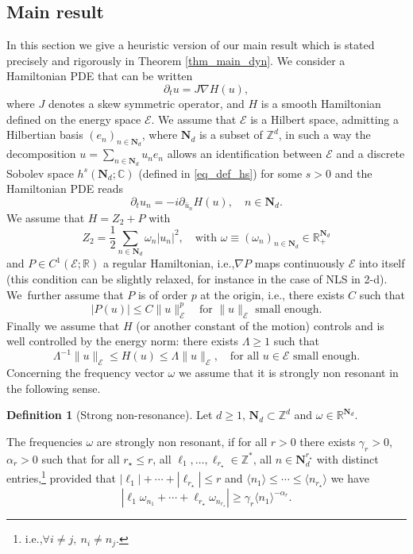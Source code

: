 \documentclass[11pt]{article}
\newcommand{\ie}{i.e.,\xspace}
\theoremstyle{definition}
\newtheorem{definition}[theorem]{Definition}
\begin{document}
\subsection{Main result}
In this section we give a heuristic version of our main result which is stated precisely and rigorously in Theorem \ref{thm_main_dyn}.
We consider a Hamiltonian PDE that can be written
\[
\partial_t u=J\nabla H(u),
\]
where $J$ denotes a skew symmetric operator, and $H$ is a smooth Hamiltonian defined on the energy space $\mathcal E$. We assume that $\mathcal E$ is a Hilbert space, admitting a Hilbertian basis $(e_n)_{n\in \mathbf{N}_d}$, where $\mathbf{N}_d$ is a subset of $\mathbb{Z}^d$, in such a way the decomposition $u=\sum_{n\in \mathbf{N}_d}u_ne_n $ allows an identification between $\mathcal E$ and a discrete Sobolev space $h^s(\mathbf{N}_d;\mathbb{C})$ (defined in \eqref{eq_def_hs}) for some $s>0$ and the Hamiltonian PDE reads
\[
\partial_t u_n =-i \partial_{\bar u_n}H(u),\quad n\in \mathbf{N}_d.
\]
We assume that $H=Z_2+P$ with
\[
Z_2=\frac12\sum_{n\in\mathbf{N}_d}\omega_n |u_n|^2,\quad \text{with }\omega\equiv(\omega_n)_{n\in\mathbf{N}_d }\in \mathbb{R}_{+}^{\mathbf{N}_d}
\]
and $P\in C^1(\mathcal E;\mathbb{R})$ a regular Hamiltonian, \ie $\nabla P$ maps continuously $\mathcal E$ into itself (this condition can be slightly relaxed, for instance in the case of NLS in 2-d). We~further assume that $P$ is of order $p$ at the origin, \ie there exists $C$ such that
\begin{equation}\label{P}|P(u)|\leq C\| u\|_{\mathcal{E}}^p\quad \text{for } \|u\|_{\mathcal{E}} \text{ small enough.} \end{equation} Finally we assume that $H$ (or another constant of the motion) controls and is well controlled by the energy norm: there exists $\Lambda \geq 1$ such that
\begin{equation}\label{Lambda}\Lambda^{-1}\| u\|_{\mathcal{E}} \leq H(u)\leq \Lambda \|u\|_{\mathcal{E}},\quad \text{for all }u\in{\mathcal{E}} \text{ small enough.}\end{equation}
Concerning the frequency vector $\omega$ we assume that it is strongly non resonant in the following sense.
\begin{definition}[Strong non-resonance]
\label{def_SNR} Let $d\geq 1$, $\mathbf{N}_d \subset \mathbb{Z}^d$ and $\omega \in \mathbb{R}^{\mathbf{N}_d}$.

The frequencies $\omega$ are strongly non resonant, if for all $r>0$ there exists $\gamma_r>0$, $\alpha_r>0$ such that for all $r_\star \leq r$, all $\ell_1,\dots,\ell_{r_\star} \in \mathbb{Z}^*$, all $n \in \mathbf{N}_d^{r_\star}$ with distinct entries,\footnote{\ie $\forall i\neq j,\ n_i\neq n_j$.} provided that $|\ell_1|+\cdots+|\ell_{r_\star}| \leq r$ and $\langle n_1 \rangle \leq \cdots \leq \langle n_{r_\star} \rangle$ we have
\begin{equation}
\label{eq_est_NR}
|\ell_1 \omega_{n_1} + \cdots + \ell_{r_\star} \omega_{n_{r_\star}} | \geq \gamma_{r} \langle n_1 \rangle^{-\alpha_r}.
\end{equation}
\end{definition}
\end{document}
